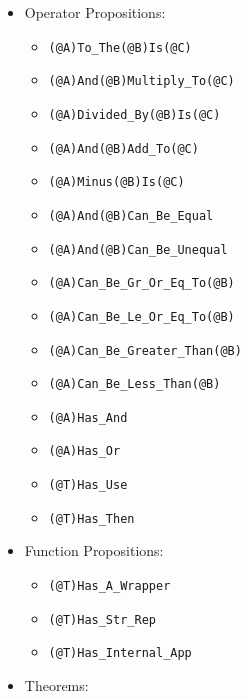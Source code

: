 \documentclass[diploma]{softlab-thesis}
\begin{document}
\begin{itemize}

\item Operator Propositions:

  \begin{itemize}
  \item \verb|(@A)To_The(@B)Is(@C)|
  \item \verb|(@A)And(@B)Multiply_To(@C)|
  \item \verb|(@A)Divided_By(@B)Is(@C)|
  \item \verb|(@A)And(@B)Add_To(@C)|
  \item \verb|(@A)Minus(@B)Is(@C)|
  \item \verb|(@A)And(@B)Can_Be_Equal|
  \item \verb|(@A)And(@B)Can_Be_Unequal|
  \item \verb|(@A)Can_Be_Gr_Or_Eq_To(@B)|
  \item \verb|(@A)Can_Be_Le_Or_Eq_To(@B)|
  \item \verb|(@A)Can_Be_Greater_Than(@B)|
  \item \verb|(@A)Can_Be_Less_Than(@B)|
  \item \verb|(@A)Has_And|
  \item \verb|(@A)Has_Or|
  \item \verb|(@T)Has_Use|
  \item \verb|(@T)Has_Then|
  \end{itemize}

\item Function Propositions:

  \begin{itemize}
  \item \verb|(@T)Has_A_Wrapper|
  \item \verb|(@T)Has_Str_Rep|
  \item \verb|(@T)Has_Internal_App|
  \end{itemize}

\newpage
\item Theorems:


\end{itemize}
\end{document}
